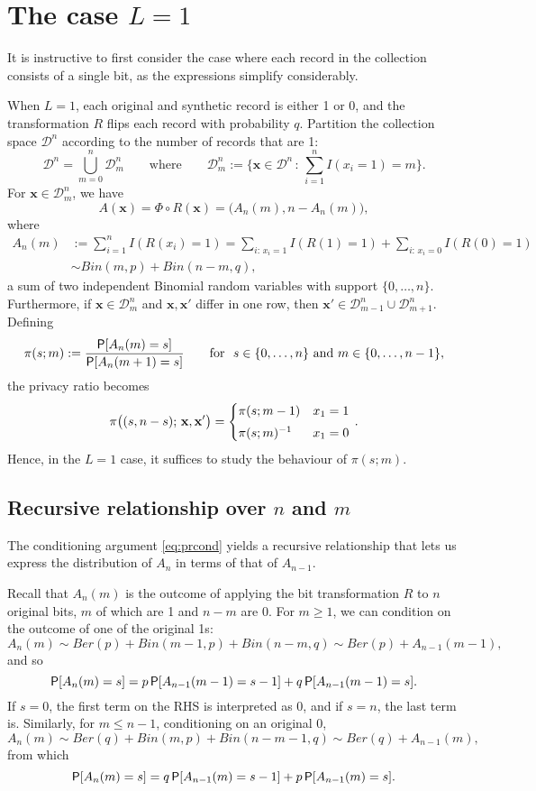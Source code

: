 \documentclass[11pt,draft]{article}
\newcommand{\Dsp}{\mathcal{D}}
\newcommand{\xv}{\mathbf{x}}
\begin{document}
\section{The case $L = 1$}

It is instructive to first consider the case where each record in the collection consists of a single bit, as the expressions simplify considerably.

When $L=1$, each original and synthetic record is either 1 or 0, and the transformation $R$ flips each record with probability $q$.
Partition the collection space $\Dsp^n$ according to the number of records that are 1:
\[ \Dsp^n = \bigcup_{m = 0}^n \Dsp_m^n
\quad\quad\text{where}\quad\quad
\Dsp_m^n := \bigg\{ \xv\in\Dsp^n \,:\, \sum_{i=1}^n I(x_i = 1) = m \bigg\}.
\]
For $\xv\in\Dsp_m^n$, we have
\[ A(\xv) = \Phi\circ R(\xv) = \big(A_n(m), n - A_n(m)\big), \]
where
\begin{align*}
A_n(m) &:= \sum_{i=1}^n I(R(x_i) = 1)
= \sum_{i:\, x_i = 1} I(R(1) = 1) + \sum_{i:\, x_i = 0} I(R(0) = 1) \\
&\sim Bin(m, p) + Bin(n-m, q),
\end{align*}
a sum of two independent Binomial random variables with support $\{0,\dots,n\}$.
Furthermore, if $\xv\in\Dsp_m^n$ and $\xv,\xv'$ differ in one row, then $\xv'\in\Dsp_{m-1}^n \cup \Dsp_{m+1}^n$.
Defining
\[ \pi(s; m) := \frac{\P[A_n(m) = s]}{\P[A_n(m+1) = s]}
\quad\quad\text{for}\ \ 
s\in\{0,\dots,n\}\ \text{and}\ m\in\{0,\dots,n-1\},
\]
the privacy ratio becomes
\[ \pi\big((s, n-s);\,\xv,\xv'\big) =
\begin{cases}
\pi(s;m - 1) & x_1 = 1 \\[0.3em]
\inv{\pi(s;m)} & x_1 = 0
\end{cases}\, .
\]
Hence, in the $L=1$ case, it suffices to study the behaviour of $\pi(s;m)$.


\subsection{Recursive relationship over $n$ and $m$}

The conditioning argument \eqref{eq:prcond} yields a recursive relationship that lets us express the distribution of $A_n$ in terms of that of $A_{n-1}$.

Recall that $A_n(m)$ is the outcome of applying the bit transformation $R$ to $n$ original bits, $m$ of which are 1 and $n-m$ are 0.
For $m \geq 1$, we can condition on the outcome of one of the original 1s:
\[ A_n(m) \sim Ber(p) + Bin(m-1, p) + Bin(n-m, q) \sim Ber(p) + A_{n-1}(m-1), \]
and so
\begin{equation}\label{eq:rec1}
\P[A_n(m) = s] = p\P[A_{n-1}(m-1) = s-1] + q\P[A_{n-1}(m-1) = s].
\end{equation}
If $s = 0$, the first term on the RHS is interpreted as 0, and if $s = n$, the last term is.
Similarly, for $m \leq n-1$, conditioning on an original 0,
\[ A_n(m) \sim Ber(q) + Bin(m, p) + Bin(n-m-1, q) \sim Ber(q) + A_{n-1}(m), \]
from which
\begin{equation}\label{eq:rec0}
\P[A_n(m) = s] = q\P[A_{n-1}(m) = s-1] + p\P[A_{n-1}(m) = s].
\end{equation}
\end{document}
